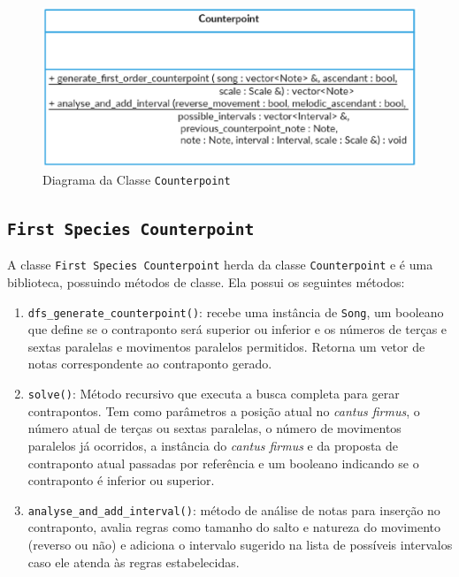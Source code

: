     \begin{figure}[htb]
      \centering
      \includegraphics[scale=0.7]{figuras/counterpointclass.eps}
      \caption{Diagrama da Classe \texttt{Counterpoint}}
      \label{counterpointclass}
    \end{figure}

    \subsection[\texttt{First Species Counterpoint}]{\texttt{First Species Counterpoint}} \label{ssec:fec}

      A classe \texttt{First Species Counterpoint} herda da classe \texttt{Counterpoint} e é uma biblioteca, possuindo métodos de classe. Ela possui os seguintes métodos:

      \begin{enumerate}
        \item \texttt{dfs\_generate\_counterpoint()}: recebe uma instância de \texttt{Song}, um booleano que define se o contraponto será superior ou inferior e os números de terças e sextas paralelas e movimentos paralelos permitidos. Retorna um vetor de notas correspondente ao contraponto gerado.
        \item \texttt{solve()}: Método recursivo que executa a busca completa para gerar contrapontos. Tem como parâmetros a posição atual no \textit{cantus firmus}, o número atual de terças ou sextas paralelas, o número de movimentos paralelos já ocorridos, a instância do \textit{cantus firmus} e da proposta de contraponto atual passadas por referência e um booleano indicando se o contraponto é inferior ou superior.
        \item \texttt{analyse\_and\_add\_interval()}: método de análise de notas para inserção no contraponto, avalia regras como tamanho do salto e natureza do movimento (reverso ou não) e adiciona o intervalo sugerido na lista de possíveis intervalos caso ele atenda às regras estabelecidas.
      \end{enumerate}

